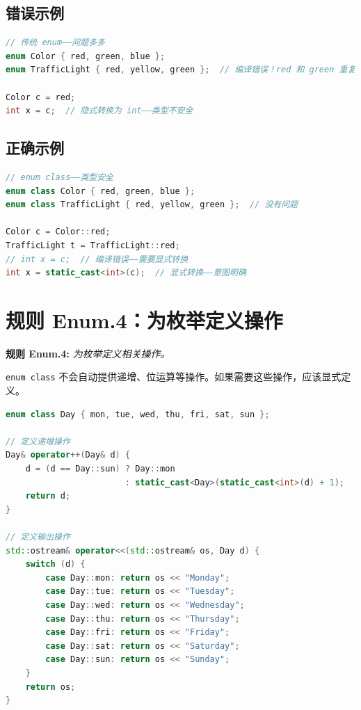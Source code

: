 \subsection{错误示例}

\begin{lstlisting}[language=C++]
// 传统 enum——问题多多
enum Color { red, green, blue };
enum TrafficLight { red, yellow, green };  // 编译错误！red 和 green 重复

Color c = red;
int x = c;  // 隐式转换为 int——类型不安全
\end{lstlisting}

\subsection{正确示例}

\begin{lstlisting}[language=C++]
// enum class——类型安全
enum class Color { red, green, blue };
enum class TrafficLight { red, yellow, green };  // 没有问题

Color c = Color::red;
TrafficLight t = TrafficLight::red;
// int x = c;  // 编译错误——需要显式转换
int x = static_cast<int>(c);  // 显式转换——意图明确
\end{lstlisting}

\section{规则 Enum.4：为枚举定义操作}

\textbf{规则 Enum.4:} \textit{为枚举定义相关操作。}

\texttt{enum class} 不会自动提供递增、位运算等操作。如果需要这些操作，应该显式定义。

\begin{lstlisting}[language=C++]
enum class Day { mon, tue, wed, thu, fri, sat, sun };

// 定义递增操作
Day& operator++(Day& d) {
    d = (d == Day::sun) ? Day::mon
                        : static_cast<Day>(static_cast<int>(d) + 1);
    return d;
}

// 定义输出操作
std::ostream& operator<<(std::ostream& os, Day d) {
    switch (d) {
        case Day::mon: return os << "Monday";
        case Day::tue: return os << "Tuesday";
        case Day::wed: return os << "Wednesday";
        case Day::thu: return os << "Thursday";
        case Day::fri: return os << "Friday";
        case Day::sat: return os << "Saturday";
        case Day::sun: return os << "Sunday";
    }
    return os;
}
\end{lstlisting}


